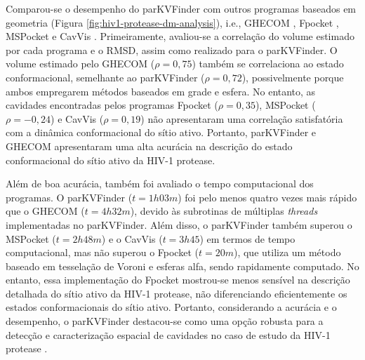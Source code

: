 \documentclass[Portugues]{phdquali}
\def\ie{i.e.\onedot}
\begin{document}


Comparou-se o desempenho do parKVFinder \cite{guerra2020} com outros programas baseados em geometria (Figura \ref{fig:hiv1-protease-dm-analysis}), \ie, GHECOM \cite{ghecom}, Fpocket \cite{fpocket}, MSPocket \cite{mspocket} e CavVis \cite{cavvis}. Primeiramente, avaliou-se a correlação do volume estimado por cada programa e o RMSD, assim como realizado para o parKVFinder. O volume estimado pelo GHECOM ($\rho = 0,75$) também se correlaciona ao estado conformacional, semelhante ao parKVFinder ($\rho = 0,72$), possivelmente porque ambos empregarem métodos baseados em grade e esfera. No entanto, as cavidades encontradas pelos programas Fpocket ($\rho = 0,35$), MSPocket ($\rho = -0,24$) e CavVis ($\rho = 0,19$) não apresentaram uma correlação satisfatória com a dinâmica conformacional do sítio ativo. Portanto, parKVFinder e GHECOM apresentaram uma alta acurácia na descrição do estado conformacional do sítio ativo da HIV-1 protease. 

Além de boa acurácia, também foi avaliado o tempo computacional dos programas. O parKVFinder ($t = 1h03m$) foi pelo menos quatro vezes mais rápido que o GHECOM ($t = 4h32m$), devido às subrotinas de múltiplas \textit{threads} implementadas no parKVFinder. Além disso, o parKVFinder também superou o MSPocket ($t = 2h48m$) e o CavVis ($t = 3h45$) em termos de tempo computacional, mas não superou o Fpocket ($t = 20m$), que utiliza um método baseado em tesselação de Voroni e esferas alfa, sendo rapidamente computado. No entanto, essa implementação do Fpocket mostrou-se menos sensível na descrição detalhada do sítio ativo da HIV-1 protease, não diferenciando eficientemente os estados conformacionais do sítio ativo. Portanto, considerando a acurácia e o desempenho, o parKVFinder destacou-se como uma opção robusta para a detecção e caracterização espacial de cavidades no caso de estudo da HIV-1 protease \cite{guerra2020}.
\end{document}
